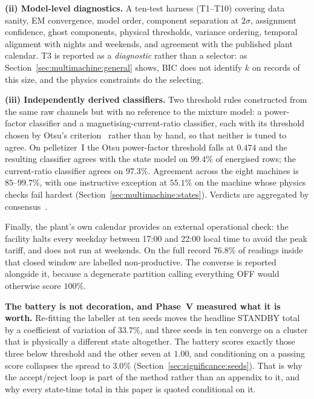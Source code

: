 \textbf{(ii) Model-level diagnostics.} A ten-test harness (T1--T10)
covering data sanity, EM convergence, model order, component separation
at $2\sigma$, assignment confidence, ghost components, physical
thresholds, variance ordering, temporal alignment with nights and
weekends, and agreement with the published plant calendar. T3 is
reported as a \emph{diagnostic} rather than a selector: as
Section~\ref{sec:multimachine:general} shows, BIC does not identify $k$
on records of this size, and the physics constraints do the selecting.

\textbf{(iii) Independently derived classifiers.} Two threshold rules
constructed from the same raw channels but with no reference to the
mixture model: a power-factor classifier and a magnetising-current-ratio
classifier, each with its threshold chosen by Otsu's
criterion~\cite{otsu1979threshold} rather than by hand, so that neither
is tuned to agree. On pelletizer~I the Otsu power-factor threshold falls
at $0.474$ and the resulting classifier agrees with the state model on
$\mathbf{99.4\%}$ of energised rows; the current-ratio classifier agrees
on $97.3\%$. Agreement across the eight machines is $85$--$99.7\%$, with
one instructive exception at $55.1\%$ on the machine whose physics
checks fail hardest (Section~\ref{sec:multimachine:states}). Verdicts
are aggregated by consensus~\cite{strehl2002cluster}.

Finally, the plant's own calendar provides an external operational
check: the facility halts every weekday between 17:00 and 22:00 local
time to avoid the peak tariff, and does not run at weekends. On the full
record $76.8\%$ of readings inside that closed window are labelled
non-productive. The converse is reported alongside it, because a
degenerate partition calling everything OFF would otherwise score
$100\%$.

\textbf{The battery is not decoration, and Phase~V measured what it is
worth.} Re-fitting the labeller at ten seeds moves the headline STANDBY
total by a coefficient of variation of $33.7\%$, and three seeds in ten
converge on a cluster that is physically a different state altogether.
The battery scores exactly those three below threshold and the other
seven at $1.00$, and conditioning on a passing score collapses the
spread to $3.0\%$ (Section~\ref{sec:significance:seeds}). That is why
the accept/reject loop is part of the method rather than an appendix to
it, and why every state-time total in this paper is quoted conditional
on it.
